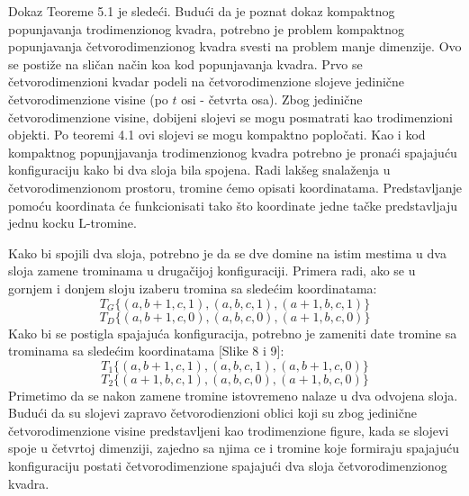 Dokaz Teoreme 5.1 je sledeći. Budući da je poznat dokaz kompaktnog popunjavanja trodimenzionog kvadra, potrebno je problem kompaktnog popunjavanja četvorodimenzionog kvadra svesti na problem manje dimenzije. Ovo se postiže na sličan način koa kod popunjavanja kvadra. Prvo se četvorodimenzioni kvadar podeli na četvorodimenzione slojeve jedinične četvorodimenzione visine (po $t$ osi - četvrta osa). Zbog jedinične četvorodimenzione visine, dobijeni slojevi se mogu posmatrati kao trodimenzioni objekti. Po teoremi 4.1 ovi slojevi se mogu kompaktno popločati. Kao i kod kompaktnog popunjjavanja trodimenzionog kvadra potrebno je pronaći spajajuću konfiguraciju kako bi dva sloja bila spojena. Radi lakšeg snalaženja u četvorodimenzionom prostoru, tromine ćemo opisati koordinatama. Predstavljanje pomoću koordinata će funkcionisati tako što koordinate jedne tačke predstavljaju jednu kocku L-tromine.



Kako bi spojili dva sloja, potrebno je da se dve domine na istim mestima u dva sloja zamene trominama u drugačijoj konfiguraciji. Primera radi, ako se u gornjem i donjem sloju izaberu tromina sa sledećim koordinatama: $$T_G\{(a, b+1, c, 1), (a, b, c, 1), (a+1, b, c, 1)\}$$  $$T_D\{(a, b+1, c, 0), (a, b, c, 0), (a+1, b, c, 0)\}$$
Kako bi se postigla spajajuća konfiguracija, potrebno je zameniti date tromine sa trominama sa sledećim koordinatama [Slike 8 i 9]: $$T_1\{(a, b+1, c, 1), (a, b, c, 1), (a, b+1, c, 0)\}$$  $$T_2\{(a+1, b, c, 1), (a, b, c, 0), (a+1, b, c, 0)\}$$ Primetimo da se nakon zamene tromine istovremeno nalaze u dva odvojena sloja. Budući da su slojevi zapravo četvorodienzioni oblici koji su zbog jedinične četvorodimenzione visine predstavljeni kao trodimenzione figure, kada se slojevi spoje u četvrtoj dimenziji, zajedno sa njima ce i tromine koje formiraju spajajuću konfiguraciju postati četvorodimenzione spajajući dva sloja četvorodimenzionog kvadra.





